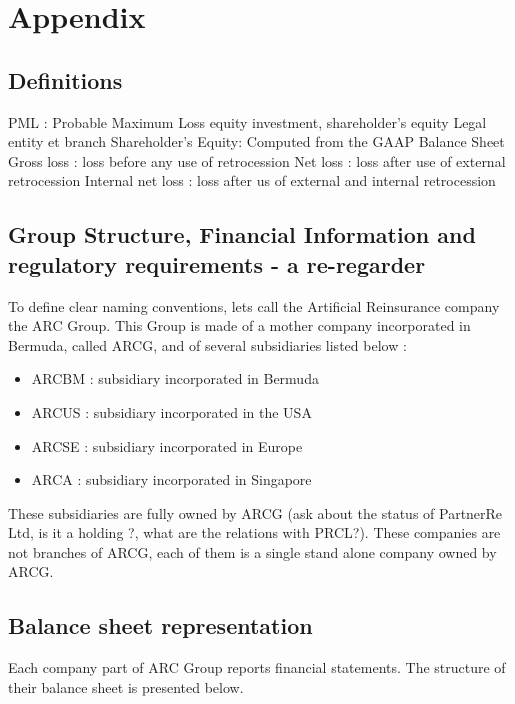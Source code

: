 \chapter{Appendix}
\label{sec:APPENDIX}


\section{Definitions}

PML : Probable Maximum Loss
equity investment, shareholder's equity
Legal entity et branch
Shareholder’s Equity: Computed from the GAAP Balance Sheet
Gross loss : loss before any use of retrocession
Net loss : loss after use of external retrocession
Internal net loss : loss after us of external and internal retrocession


\section{Group Structure, Financial Information and regulatory requirements - a re-regarder}

To define clear naming conventions, lets call the Artificial Reinsurance company the ARC Group. This Group is made of a mother company incorporated in Bermuda, called ARCG, and of several subsidiaries listed below :


\begin{itemize}
\item ARCBM : subsidiary incorporated in Bermuda
\item ARCUS : subsidiary incorporated in the USA
\item ARCSE : subsidiary incorporated in Europe
\item ARCA : subsidiary incorporated in Singapore
\end{itemize}

These subsidiaries are fully owned by ARCG (ask about the status of PartnerRe Ltd, is it a holding ?, what are the relations with PRCL?). These companies are not branches of ARCG, each of them is a single stand alone company owned by ARCG.





\section{Balance sheet representation}
\label{sec:BSR}
Each company part of ARC Group reports financial statements. The structure of their balance sheet is presented below.





